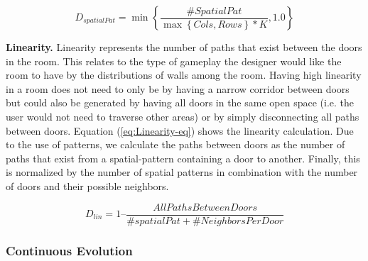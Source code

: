 \documentclass[conference]{IEEEtran}
\begin{document}



\begin{equation} 
\label{eq:spatial-pat-eq}
D_{spatialPat} = \min\left\{\frac{\#SpatialPat}{\max\left\{{Cols, Rows}\right\} * \textit{K}}, 1.0\right\}
\end{equation}

\textbf{Linearity.} Linearity represents the number of paths that exist between the doors in the room. This relates to the type of gameplay the designer would like the room to have by the distributions of walls among the room. Having high linearity in a room does not need to only be by having a narrow corridor between doors but could also be generated by having all doors in the same open space (i.e. the user would not need to traverse other areas) or by simply disconnecting all paths between doors. Equation (\ref{eq:Linearity-eq}) shows the linearity calculation. Due to the use of patterns, we calculate the paths between doors as the number of paths that exist from a spatial-pattern containing a door to another. Finally, this is normalized by the number of spatial patterns in combination with the number of doors and their possible neighbors.

\begin{equation} \label{eq:Linearity-eq}
D_{lin} = 1 \text{--} \frac{AllPathsBetweenDoors} {\#spatialPat + \#NeighborsPerDoor}
\end{equation}

\subsubsection{Continuous Evolution}
\end{document}
